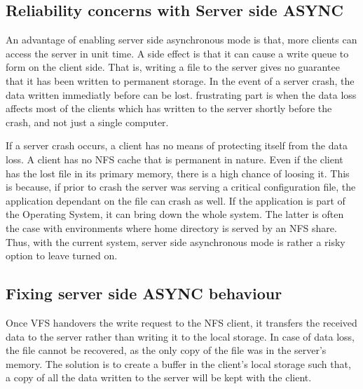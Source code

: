 \documentclass[conference]{IEEEtran}
\begin{document}
\subsection{Reliability concerns with Server side ASYNC}\label{AA}
An advantage of enabling server side asynchronous mode is that, more
clients can access the server in unit time. A side effect is that it can
cause a write queue to form on the client side. That is, writing a file to
the server gives no guarantee that it has been written to permanent storage.
In the event of a server crash, the data written immediatly before can be
lost. frustrating part is when the data loss affects most of the clients which 
has written to the server shortly before the crash, and not just a single 
computer.

If a server crash occurs, a client has no means of protecting itself from
the data loss. A client has no NFS cache that is permanent in nature. Even
if the client has the lost file in its primary memory, there is a high
chance of loosing it. This is because, if prior to crash the server was
serving a critical configuration file, the application dependant on the file
can crash as well. If the application is part of the Operating System, it can bring
down the whole system. The latter is often the case with environments where
home directory is served by an NFS share. Thus, with the current system,
server side asynchronous mode is rather a risky option to leave turned on.

\subsection{Fixing server side ASYNC behaviour}

Once VFS handovers the write request to the NFS client, it transfers the 
received data to the server rather than writing it to the local storage. In
case of data loss, the file cannot be recovered, as the only copy of the
file was in the server's memory. The solution is to create a buffer in the 
client's local storage such that, a copy of all the data written to the server 
will be kept with the client.
\end{document}
